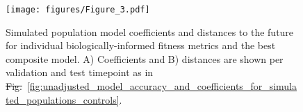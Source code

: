\documentclass[9pt,lineno]{elife} %
\providecommand{\DIFadd}[1]{{\protect\color{blue}\uwave{#1}}} %
\providecommand{\DIFdel}[1]{{\protect\color{red}\sout{#1}}}                      %
\providecommand{\DIFaddFL}[1]{\DIFadd{#1}} %
\providecommand{\DIFdelFL}[1]{\DIFdel{#1}} %
\providecommand{\DIFaddbeginFL}{} %
\providecommand{\DIFaddendFL}{} %
\providecommand{\DIFdelbeginFL}{} %
\providecommand{\DIFdelendFL}{} %
\providecommand{\DIFaddtex}[1]{{\protect\color{blue}\uwave{#1}}} %
\providecommand{\DIFdeltex}[1]{{\protect\color{red}\sout{#1}}}                      %
\providecommand{\DIFaddFL}[1]{\DIFadd{#1}} %
\providecommand{\DIFdelFL}[1]{\DIFdel{#1}} %
\providecommand{\DIFaddbeginFL}{} %
\providecommand{\DIFaddendFL}{} %
\providecommand{\DIFdelbeginFL}{} %
\providecommand{\DIFdelendFL}{} %
\providecommand{\DIFadd}[1]{\texorpdfstring{\DIFaddtex{#1}}{#1}} %
\providecommand{\DIFdel}[1]{\texorpdfstring{\DIFdeltex{#1}}{}} %
\newcommand{\DIFscaledelfig}{0.5}
\newlength{\DIFdelgraphicswidth} %
\newlength{\DIFdelgraphicsheight} %
\newcommand{\DIFaddincludegraphics}[2][]{{\color{blue}\fbox{\DIFOincludegraphics[#1]{#2}}}} %
\newcommand{\DIFdelincludegraphics}[2][]{%
\sbox{\DIFdelgraphicsbox}{\DIFOincludegraphics[#1]{#2}}%
\settoboxwidth{\DIFdelgraphicswidth}{\DIFdelgraphicsbox} %
\settoboxtotalheight{\DIFdelgraphicsheight}{\DIFdelgraphicsbox} %
\scalebox{\DIFscaledelfig}{%
\parbox[b]{\DIFdelgraphicswidth}{\usebox{\DIFdelgraphicsbox}\\[-\baselineskip] \rule{\DIFdelgraphicswidth}{0em}}\llap{\resizebox{\DIFdelgraphicswidth}{\DIFdelgraphicsheight}{%
\setlength{\unitlength}{\DIFdelgraphicswidth}%
\begin{picture}(1,1)%
\thicklines\linethickness{2pt} %
{\color[rgb]{1,0,0}\put(0,0){\framebox(1,1){}}}%
{\color[rgb]{1,0,0}\put(0,0){\line( 1,1){1}}}%
{\color[rgb]{1,0,0}\put(0,1){\line(1,-1){1}}}%
\end{picture}%
}\hspace*{3pt}}} %
} %
\DeclareRobustCommand{\DIFaddbeginFL}{\DIFOaddbeginFL \let\includegraphics\DIFaddincludegraphics} %
\DeclareRobustCommand{\DIFaddendFL}{\DIFOaddendFL \let\includegraphics\DIFOincludegraphics} %
\DeclareRobustCommand{\DIFdelbeginFL}{\DIFOdelbeginFL \let\includegraphics\DIFdelincludegraphics} %
\DeclareRobustCommand{\DIFdelendFL}{\DIFOaddendFL \let\includegraphics\DIFOincludegraphics} %
\begin{document}
\begin{figure}[htb]
  \DIFdelbeginFL %
\DIFdelendFL \DIFaddbeginFL \texttt{[image: figures/Figure\_3.pdf]}
  \DIFaddendFL \caption{
    Simulated population model coefficients and distances to the future for individual biologically-informed fitness metrics and the best composite model.
    A) Coefficients and B) distances are shown per validation and test timepoint as in \DIFdelbeginFL \DIFdelFL{Fig.}\DIFdelendFL \DIFaddbeginFL \DIFaddFL{Figure}\DIFaddendFL ~\ref{fig:unadjusted_model_accuracy_and_coefficients_for_simulated_populations_controls}.
  }
  \label{fig:unadjusted_model_accuracy_and_coefficients_for_simulated_populations}
\DIFdelbeginFL %
\DIFdelendFL \DIFaddbeginFL 

  \label{figsupp:unadjusted_composite_model_accuracy_and_coefficients_for_simulated_populations}

\DIFaddendFL \end{figure}
\end{document}
